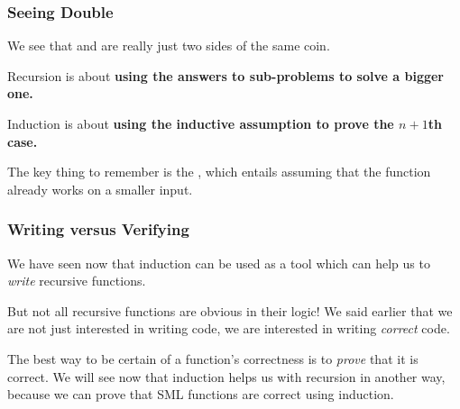 \documentclass[aspectratio=169]{beamer}
\begin{document}
\begin{frame}[fragile]
  \frametitle{Seeing Double}

  We see that  and  are really just two sides of the same coin.

  \pause
  \vspace{\fill}

  Recursion is about \textbf{using the answers to sub-problems to solve a bigger one.}

  \pause
  \vspace{\fill}

  Induction is about \textbf{using the inductive assumption to prove the $n + 1$th case.}

  \pause
  \vspace{\fill}

  The key thing to remember is the , which entails
  assuming that the function already works on a smaller input.

  \ptmt
\end{frame}

\begin{frame}[fragile]
  \frametitle{Writing versus Verifying}

  We have seen now that induction can be used as a tool which can help us to
  \textit{write} recursive functions.

  \pause
  \vspace{\fill}

  But not all recursive functions are obvious in their logic! We said earlier
  that we are not just interested in writing code, we are interested in writing
  \textit{correct} code.

  \pause
  \vspace{\fill}

  The best way to be certain of a function's correctness is to \textit{prove}
  that it is correct. We will see now that induction helps us with recursion
  in another way, because we can prove that SML functions are correct using
  induction.

\end{frame}

\end{document}
